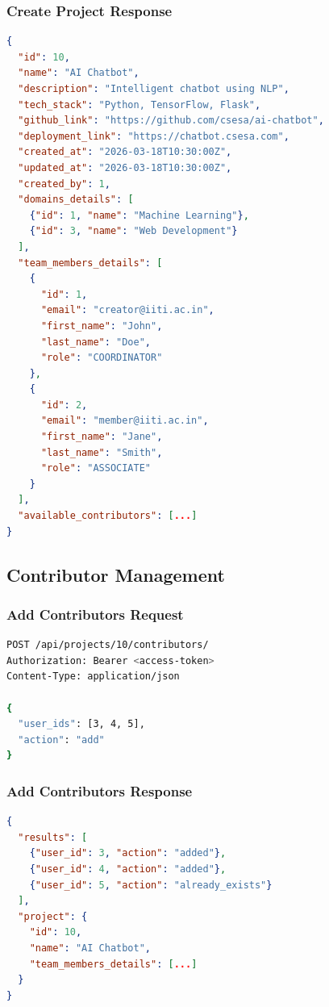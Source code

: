 \documentclass[11pt,a4paper]{article}
\begin{document}
\subsubsection{Create Project Response}
\begin{lstlisting}[language=JSON]
{
  "id": 10,
  "name": "AI Chatbot",
  "description": "Intelligent chatbot using NLP",
  "tech_stack": "Python, TensorFlow, Flask",
  "github_link": "https://github.com/csesa/ai-chatbot",
  "deployment_link": "https://chatbot.csesa.com",
  "created_at": "2026-03-18T10:30:00Z",
  "updated_at": "2026-03-18T10:30:00Z",
  "created_by": 1,
  "domains_details": [
    {"id": 1, "name": "Machine Learning"},
    {"id": 3, "name": "Web Development"}
  ],
  "team_members_details": [
    {
      "id": 1,
      "email": "creator@iiti.ac.in",
      "first_name": "John",
      "last_name": "Doe",
      "role": "COORDINATOR"
    },
    {
      "id": 2,
      "email": "member@iiti.ac.in",
      "first_name": "Jane",
      "last_name": "Smith",
      "role": "ASSOCIATE"
    }
  ],
  "available_contributors": [...]
}
\end{lstlisting}

\subsection{Contributor Management}

\subsubsection{Add Contributors Request}
\begin{lstlisting}[language=bash]
POST /api/projects/10/contributors/
Authorization: Bearer <access-token>
Content-Type: application/json

{
  "user_ids": [3, 4, 5],
  "action": "add"
}
\end{lstlisting}

\subsubsection{Add Contributors Response}
\begin{lstlisting}[language=JSON]
{
  "results": [
    {"user_id": 3, "action": "added"},
    {"user_id": 4, "action": "added"},
    {"user_id": 5, "action": "already_exists"}
  ],
  "project": {
    "id": 10,
    "name": "AI Chatbot",
    "team_members_details": [...]
  }
}
\end{lstlisting}
\end{document}

